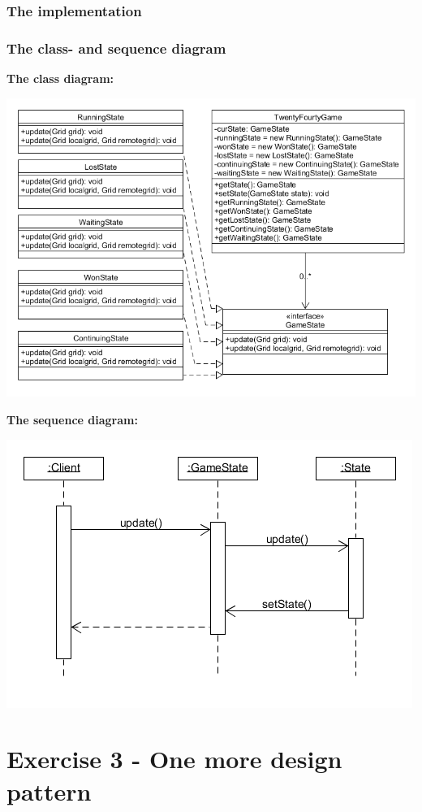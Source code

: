 \documentclass[a4paper,11pt,report]{scrartcl}
\begin{document}
\subsubsection{The implementation}

\newpage\subsubsection{The class- and sequence diagram}
\textbf{The class diagram:}\\
\centerline{\includegraphics[scale=0.7]{statePatternUML}}

\newpage\textbf{The sequence diagram:}\\
\centerline{\includegraphics[scale=1]{statePatternSequence}}

\newpage\section{Exercise 3 - One more design pattern}
\end{document}
